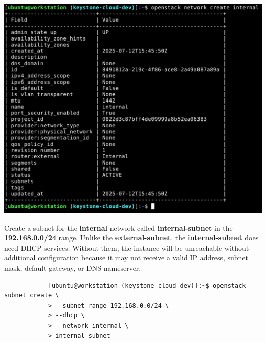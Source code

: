 \documentclass[letterpaper, 12pt]{article}
\begin{document}
\begin{enumerate}
\begin{labstep}
        \begin{center}
            \includegraphics[width=\linewidth]{images/part1/step26.png}
        \end{center}
    \end{labstep}

    \begin{labstep}
        Create a subnet for the \textbf{internal} network called \textbf{internal-subnet} in the \textbf{192.168.0.0/24} range.
        Unlike the \textbf{external-subnet}, the \textbf{internal-subnet} does need DHCP services.
        Without them, the instance will be unreachable without additional configuration because it may not receive a valid IP address, subnet mask, default gateway, or DNS nameserver.
        \begin{lstlisting}
            [ubuntu@workstation (keystone-cloud-dev)]:~$ openstack subnet create \
            > --subnet-range 192.168.0.0/24 \
            > --dhcp \
            > --network internal \
            > internal-subnet
        \end{lstlisting}


\end{labstep}
\end{enumerate}
\end{document}

